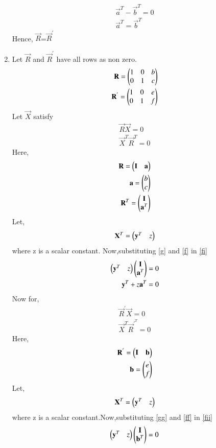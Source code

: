 \documentclass[journal,12pt,twocolumn]{IEEEtran}
\begin{document}
\begin{enumerate}
\begin{align}
  \vec{a}^T-\vec{b}^T=0\\
   \vec{a}^T= \vec{b}^T
   \end{align}
 Hence, $\vec{R}$=$\vec{R}^{\prime}$
 \item Let $\vec{R}$ and $\vec{R}^{'}$ have all rows as non zero.
\begin{align}\mathbf{R}=\begin{pmatrix}1&0&b\\0&1&c\end{pmatrix} \\\mathbf{R}^{'}=\begin{pmatrix}1&0&e\\0&1&f\end{pmatrix}\end{align}
 Let $\vec{X}$ satisfy
  \begin{align}
  \vec{R}\vec{X}=0\label{e}\\
  \vec{X}^{T}\vec{R}^{T}=0\label{fi}
  \end{align}
  Here,
  \begin{align}
  \mathbf{R}=\begin{pmatrix}\mathbf{I}&\mathbf{a}\end{pmatrix}\label{f}\\
  \mathbf{a}=\begin{pmatrix}b \\c\end{pmatrix}\\
  \mathbf{R}^{T}=\begin{pmatrix}\mathbf{I}\\\mathbf{a}^T\end{pmatrix}
  \end{align}
  Let,
  \begin{align}
  \mathbf{X}^T=\begin{pmatrix}\mathbf{y}^T&z\end{pmatrix}\label{g}
  \end{align}
  where z is a scalar constant. Now,substituting \eqref{g} and \eqref{f} in \eqref{fi}
  \begin{align}
  \begin{pmatrix}\mathbf{y}^T&z\end{pmatrix}\begin{pmatrix}\mathbf{I}\\\mathbf{a}^T\end{pmatrix}=0\\
  \mathbf{y}^T+z\mathbf{a}^T=0\label{49}
  \end{align}
  Now for,
  \begin{align}
  \vec{R}^{'}\vec{X}=0\label{ee}\\
  \vec{X}^{T}\vec{R}^{'}^{T}=0\label{fii}
  \end{align}
  Here,
  \begin{align}
  \mathbf{R}^{'}=\begin{pmatrix}\mathbf{I}&\mathbf{b}\end{pmatrix}\label{ff}\\
  \mathbf{b}=\begin{pmatrix}e\\f\end{pmatrix}
  \end{align}
  Let,
  \begin{align}
  \mathbf{X}^T=\begin{pmatrix}\mathbf{y}^T&z\end{pmatrix}\label{gg}
  \end{align}
  where z is a scalar constant.Now,substituting \eqref{gg} and \eqref{ff} in \eqref{fii}
  \begin{align}
    \myvec{\vec{y}^T&z}\myvec{\vec{I}\\\vec{b}^T}=0\\

\end{align}
\end{enumerate}
\end{document}
